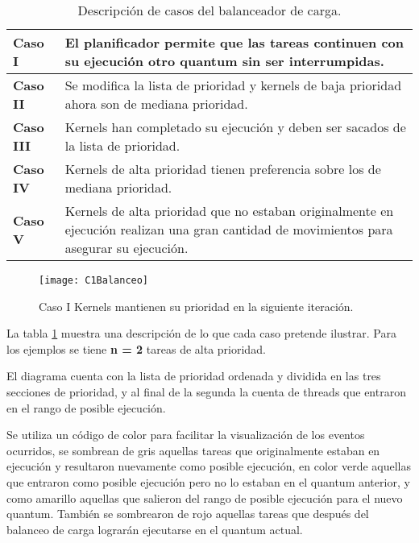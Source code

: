  \begin{table}[h!]
      \begin{center}
            \footnotesize
        \begin{tabular}{|m{2cm}|m{9cm}|}
         \hline
         \cellcolor{lightgray}\textbf{Caso I} & El planificador permite que las tareas continuen con su ejecución otro quantum sin ser interrumpidas.\\ 
         \hline
          \cellcolor{lightgray}\textbf{Caso II} & Se modifica la lista de prioridad y kernels de baja prioridad ahora son de mediana prioridad.\\ 
         \hline  
         \cellcolor{lightgray}\textbf{Caso III} & Kernels han completado su ejecución y deben ser sacados de la lista de prioridad.\\ 
         \hline
         \cellcolor{lightgray}\textbf{Caso IV} & Kernels de alta prioridad tienen preferencia sobre los de mediana prioridad.\\ 
         \hline
         \cellcolor{lightgray}\textbf{Caso V} & Kernels de alta prioridad que no estaban originalmente en ejecución realizan una gran cantidad de movimientos para asegurar su ejecución.\\ 
         \hline
           \end{tabular}
        \caption{Descripción de casos del balanceador de carga.}
        \label{tab:Casos}
      \end{center}
    \end{table}

    \begin{figure}[h!]
      \centering
        \texttt{[image: C1Balanceo]}
        \caption{Caso I Kernels mantienen su prioridad en la siguiente iteración.}
        \label{fig:C1Balanceo}
    \end{figure}

La tabla \ref{tab:Casos} muestra una descripción de lo que cada caso pretende ilustrar. Para los ejemplos se tiene \textbf{n = 2} tareas de alta prioridad.
\newline
   
El diagrama cuenta con la lista de prioridad ordenada y dividida en las tres secciones de prioridad, y al final de la segunda la cuenta de threads que entraron en el rango de posible ejecución.

Se utiliza un código de color para facilitar la visualización de los eventos ocurridos, se sombrean de gris aquellas tareas que originalmente estaban en ejecución y resultaron nuevamente como posible ejecución, en color verde aquellas que entraron como posible ejecución pero no lo estaban en el quantum anterior, y como amarillo aquellas que salieron del rango de posible ejecución para el nuevo quantum. 
También se sombrearon de rojo aquellas tareas que después del balanceo de carga lograrán ejecutarse en el quantum actual.
\newline

